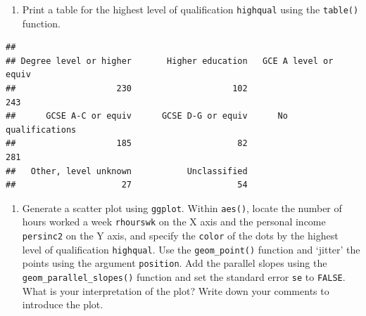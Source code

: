 \documentclass[
]{book}
\newenvironment{Shaded}{\begin{snugshade}}{\end{snugshade}}
\newcommand{\FunctionTok}[1]{\textcolor[rgb]{0.13,0.29,0.53}{\textbf{#1}}}
\newcommand{\NormalTok}[1]{#1}
\newcommand{\SpecialCharTok}[1]{\textcolor[rgb]{0.81,0.36,0.00}{\textbf{#1}}}
\providecommand{\tightlist}{%
  \setlength{\itemsep}{0pt}\setlength{\parskip}{0pt}}
\begin{document}
\begin{enumerate}
\def\labelenumi{\arabic{enumi}.}
\setcounter{enumi}{1}
\tightlist
\item
  Print a table for the highest level of qualification \texttt{highqual} using the \texttt{table()} function.
\end{enumerate}

\begin{Shaded}
\end{Shaded}

\begin{verbatim}
## 
## Degree level or higher       Higher education   GCE A level or equiv 
##                    230                    102                    243 
##      GCSE A-C or equiv      GCSE D-G or equiv      No qualifications 
##                    185                     82                    281 
##   Other, level unknown           Unclassified 
##                     27                     54
\end{verbatim}

\begin{enumerate}
\def\labelenumi{\arabic{enumi}.}
\setcounter{enumi}{2}
\tightlist
\item
  Generate a scatter plot using \texttt{ggplot}. Within \texttt{aes()}, locate the number of hours worked a week \texttt{rhourswk} on the X axis and the personal income \texttt{persinc2} on the Y axis, and specify the \texttt{color} of the dots by the highest level of qualification \texttt{highqual}. Use the \texttt{geom\_point()} function and `jitter' the points using the argument \texttt{position}. Add the parallel slopes using the \texttt{geom\_parallel\_slopes()} function and set the standard error \texttt{se} to \texttt{FALSE}. What is your interpretation of the plot? Write down your comments to introduce the plot.
\end{enumerate}
\end{document}
